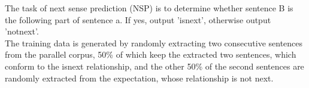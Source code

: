 \documentclass{tikzposter} %
\begin{document}
\begin{columns}
{%


\begin{description}

  	\item
   The task of next sense prediction (NSP) is to determine whether sentence B 
   is the following part of sentence a. If yes, output 'isnext', otherwise 
   output 'notnext'. \\The training data is generated by randomly extracting 
   two consecutive sentences from the parallel corpus, 50\% of which keep 
   the extracted two sentences, which conform to the isnext relationship, 
   and the other 50\% of the second sentences are randomly extracted from the 
   expectation, whose relationship is not next.

\end{description}


}







\end{columns}
\end{document}
